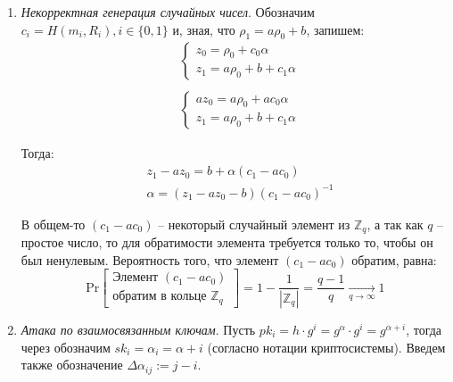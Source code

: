 \documentclass[12pt, a4paper]{extarticle}
\begin{document}
\begin{enumerate}
    \item \textit{Некорректная генерация случайных чисел}. Обозначим $c_i = H(m_i, R_i), 
   		i \in \{0, 1\}$ и, зная, что $\rho_1 = a \rho_0 + b$, запишем:
        \begin{equation*}
            \begin{split}
                & \left\{\begin{array}{l}
                    z_0 = \rho_0 + c_0 \alpha \\
                    z_1 = a \rho_0 + b + c_1 \alpha
                \end{array}\right. \\ \\
                & \left\{\begin{array}{l}
                    a z_0 = a \rho_0 + a c_0 \alpha \\
                    z_1 = a \rho_0 + b + c_1 \alpha
                \end{array}\right.
            \end{split}
        \end{equation*}
        
        Тогда:
        \begin{equation*}
            \begin{split}
                & z_1 - a z_0 = b + \alpha (c_1 - a c_0) \\
                & \alpha = (z_1 - a z_0 - b)(c_1 - a c_0)^{-1}
            \end{split}
        \end{equation*}
        
        В общем-то $(c_1 - a c_0)$ -- некоторый случайный элемент из $\mathbb{Z}_q$, а так как 
        $q$ -- простое число, то для обратимости элемента требуется только то, чтобы он был 
        ненулевым. Вероятность того, что элемент $(c_1 - a c_0)$ обратим, равна:
        \begin{equation*}
            \text{Pr}\left[\begin{array}{c}
                \text{Элемент } (c_1 - a c_0) \\
                \text{обратим в кольце } \mathbb{Z}_q
            \end{array}\right] = 1 - \frac{1}{|\mathbb{Z}_q|} = \frac{q - 1}{q} 
            	\xrightarrow[q \to \infty]{} 1
        \end{equation*}
        
    \item \textit{Атака по взаимосвязанным ключам}. Пусть $pk_i = h \cdot g^i = g^{\alpha} 
    	\cdot g^i = g^{\alpha + i}$, тогда через обозначим $sk_i = \alpha_i = \alpha + i$ 
    	(согласно нотации криптосистемы). Введем также обозначение $\Delta\alpha_{ij} := j - i$.
        

\end{enumerate}
\end{document}
